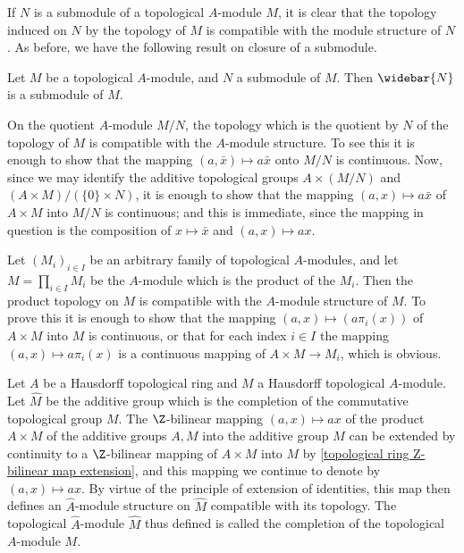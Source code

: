 If $N$ is a submodule of a topological $A$-module $M$, it is clear that the topology induced on $N$ by the topology of $M$ is compatible with the module structure of $N$. As before, we have the following result on closure of a submodule.
\begin{proposition}
Let $M$ be a topological $A$-module, and $N$ a submodule of $M$. Then $\widebar{N}$ is a submodule of $M$.
\end{proposition}
On the quotient $A$-module $M/N$, the topology which is the quotient by $N$ of the topology of $M$ is compatible with the $A$-module structure. To see this it is enough to show that the mapping $(a,\bar{x})\mapsto a\bar{x}$ onto $M/N$ is continuous. Now, since we may identify the additive topological groups $A\times(M/N)$ and $(A\times M)/(\{0\}\times N)$, it is enough to show that the mapping $(a,x)\mapsto a\bar{x}$ of $A\times M$ into $M/N$ is continuous; and this is immediate, since the mapping in question is the composition of $x\mapsto\bar{x}$ and $(a,x)\mapsto ax$.\par
Let $(M_i)_{i\in I}$ be an arbitrary family of topological $A$-modules, and let $M=\prod_{i\in I}M_i$ be the $A$-module which is the product of the $M_i$. Then the product topology on $M$ is compatible with the $A$-module structure of $M$. To prove this it is enough to show that the mapping  $(a,x)\mapsto(a\pi_i(x))$ of $A\times M$ into $M$ is continuous, or that for each index $i\in I$ the mapping $(a,x)\mapsto a\pi_i(x)$ is a continuous mapping of $A\times M\to M_i$, which is obvious.\par
Let $A$ be a Hausdorff topological ring and $M$ a Hausdorff topological $A$-module. Let $\widehat{M}$ be the additive group which is the completion of the commutative topological group $M$. The $\Z$-bilinear mapping $(a,x)\mapsto ax$ of the product $A\times M$ of the additive groups $A,M$ into the additive group $M$ can be extended by continuity to a $\Z$-bilinear mapping of $A\times M$ into $M$ by \cref{topological ring Z-bilinear map extension}, and this mapping we continue to denote by $(a,x)\mapsto ax$. By virtue of the principle of extension of identities, this map then defines an $\widehat{A}$-module structure on $\widehat{M}$ compatible with its topology. The topological $\widehat{A}$-module $\widehat{M}$ thus defined is called the completion of the topological $A$-module $M$.\par
